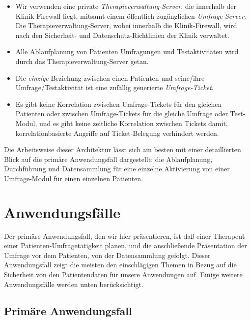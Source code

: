 \documentclass[DIV=calc,paper=a4,fontsize=11pt,twocolumn]{scrartcl}
\begin{document}
\begin{itemize}
  \item{Wir verwenden eine private \emph{Therapieverwaltung-Server},
    die innerhalb der Klinik-Firewall liegt, mitsamt einem öffentlich
    zugänglichen \emph{Umfrage-Server}. Die Therapieverwaltung-Server,
    wobei innerhalb die Klinik-Firewall, wird nach den Sicherheit- und
    Datenschutz-Richtlinien der Klinik verwaltet.}
  \item{Alle Ablaufplanung von Patienten Umfragungen und
    Testaktivitäten wird durch das Therapieverwaltung-Server getan.}
  \item{Die \emph{einzige} Beziehung zwischen einen Patienten und
    seine/ihre Umfrage/Testaktivität ist eine zufällig generierte
    \emph{Umfrage-Ticket}.}
  \item{Es gibt keine Korrelation zwischen Umfrage-Tickets für den
    gleichen Patienten oder zwischen Umfrage-Tickets für die gleiche
    Umfrage oder Test-Modul, und es gibt keine zeitliche Korrelation
    zwischen Tickets damit, korrelationbasierte Angriffe auf
    Ticket-Belegung verhindert werden.}
\end{itemize}

Die Arbeitsweise dieser Architektur lässt sich am besten mit einer
detaillierten Blick auf die primäre Anwendungsfall dargestellt: die
Ablaufplanung, Durchführung und Datensammlung für eine einzelne
Aktivierung von einer Umfrage-Modul für einen einzelnen Patienten.


\section*{Anwendungsfälle}

Der primäre Anwendungsfall, den wir hier präsentieren, ist daß einer
Therapeut einer Patienten-Umfragetätigkeit planen, und die
anschließende Präsentation der Umfrage vor dem Patienten, von der
Datensammlung gefolgt. Dieser Anwendungsfall zeigt die meisten den
einschlägigen Themen in Bezug auf die Sicherheit von den
Patientendaten für unsere Anwendungen auf. Einige weitere
Anwendungsfälle werden unten berücksichtigt.

\subsection*{Primäre Anwendungsfall}
\end{document}
